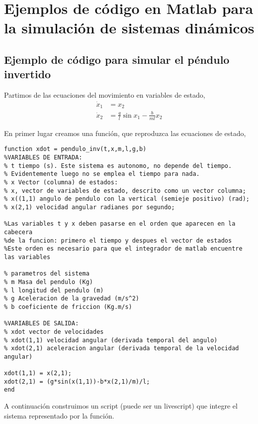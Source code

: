 \appendix
\chapter[Ejemplos de codigo de simulación]{Ejemplos de código en Matlab para la simulación de sistemas dinámicos}\label{apend1}

\section[Código para el péndulo invertido]{Ejemplo de código para simular el péndulo invertido}\label{Apinv}
Partimos de las ecuaciones del movimiento en variables de estado,
\begin{align*}
\dot x_1 &= x_2\\
\dot x_2 &= \frac{g}{l}\sin x_1 - \frac{b}{ml}x_2
\end{align*}

En primer lugar creamos una función, que reproduzca las ecuaciones de estado, 
\begin{lstlisting}
function xdot = pendulo_inv(t,x,m,l,g,b)
%VARIABLES DE ENTRADA:
% t tiempo (s). Este sistema es autonomo, no depende del tiempo. 
% Evidentemente luego no se emplea el tiempo para nada.
% x Vector (columna) de estados: 
% x, vector de variables de estado, descrito como un vector columna;  
% x((1,1) angulo de pendulo con la vertical (semieje positivo) (rad);
% x(2,1) velocidad angular radianes por segundo;

%Las variables t y x deben pasarse en el orden que aparecen en la cabecera
%de la funcion: primero el tiempo y despues el vector de estados
%Este orden es necesario para que el integrador de matlab encuentre las variables

% parametros del sistema
% m Masa del pendulo (Kg)
% l longitud del pendulo (m)
% g Aceleracion de la gravedad (m/s^2)
% b coeficiente de friccion (Kg.m/s)

%VARIABLES DE SALIDA:
% xdot vector de velocidades 
% xdot(1,1) velocidad angular (derivada temporal del angulo)
% xdot(2,1) aceleracion angular (derivada temporal de la velocidad angular)

xdot(1,1) = x(2,1);
xdot(2,1) = (g*sin(x(1,1))-b*x(2,1)/m)/l;
end
\end{lstlisting}

A continuación construimos un script (puede ser un livescript) que integre el sistema representado por la función.

